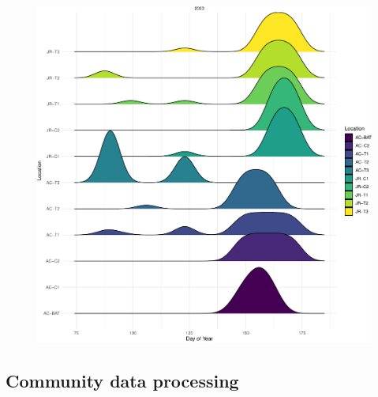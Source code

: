 \documentclass[
  letterpaper,
  DIV=11,
  numbers=noendperiod,
  oneside]{scrartcl}
\begin{document}
\begin{figure}


{\centering \includegraphics{knpr-pam_files/figure-pdf/fig-recs-collect-1.pdf}

}

\end{figure}

\hypertarget{community-data-processing}{%
\subsection{Community data processing}\label{community-data-processing}}
\end{document}
